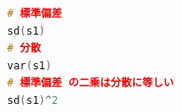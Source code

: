 \begin{lstlisting}[language=c++,label={code:20_02},caption={関数で標準偏差や分散を求める}]
# 標準偏差
sd(s1)
# 分散
var(s1)
# 標準偏差 の二乗は分散に等しい
sd(s1)^2
\end{lstlisting}
